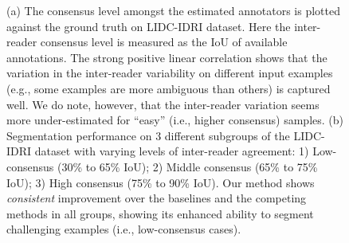 \begin{figure}[t!]
        \caption{\footnotesize (a) The consensus level amongst the estimated annotators is plotted against the ground truth on LIDC-IDRI dataset. Here the inter-reader consensus level is measured as the IoU of available annotations. The strong positive linear correlation shows that the variation in the inter-reader variability on different input examples (e.g., some examples are more ambiguous than others) is captured well. We do note, however, that the inter-reader variation seems more under-estimated for ``easy'' (i.e., higher consensus) samples. (b) Segmentation performance on 3 different subgroups of the LIDC-IDRI dataset with varying levels of inter-reader agreement: 1) Low-consensus (30\% to 65\% IoU); 2) Middle consensus (65\% to 75\% IoU); 3) High consensus (75\% to 90\% IoU). Our method shows \textit{consistent} improvement over the baselines and the competing methods in all groups, showing its enhanced ability to segment challenging examples (i.e., low-consensus cases). }
        \label{consensus dice}
\end{figure}

%
%
%

